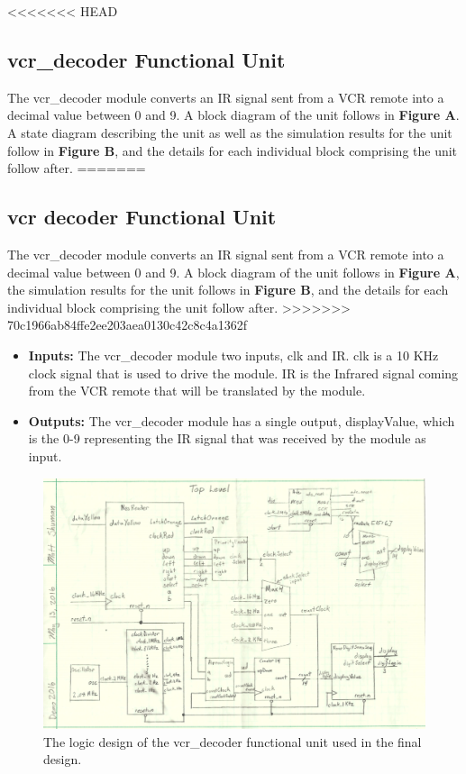 \documentclass[a4paper]{article}
\begin{document}
\clearpage



<<<<<<< HEAD
\subsection{vcr\_decoder Functional Unit}
The vcr\_decoder module converts an IR signal sent from a VCR remote into a decimal value between 0 and 9. A block diagram of the unit follows in \textbf{Figure A}. A state diagram describing the unit as well as the simulation results for the unit follow in \textbf{Figure B}, and the details for each individual block comprising the unit follow after.
=======
\subsection{vcr decoder Functional Unit}
The vcr\_decoder module converts an IR signal sent from a VCR remote into a decimal value between 0 and 9. A block diagram of the unit follows in \textbf{Figure A}, the simulation results for the unit follows in \textbf{Figure B}, and the details for each individual block comprising the unit follow after.
>>>>>>> 70c1966ab84ffe2ee203aea0130c42c8c4a1362f
\begin{itemize}
  \item \textbf{Inputs:  } The vcr\_decoder module two inputs, clk and IR. clk is a 10 KHz clock signal that is used to drive the module. IR is the Infrared signal coming from the VCR remote that will be translated by the module.
  \item \textbf{Outputs: } The vcr\_decoder module has a single output, displayValue, which is the 0-9 representing the IR signal that was received by the module as input.
\end{itemize}
\begin{figure}[h]
  \centering
    \includegraphics[width=.8\textwidth]{images/functional_1.png}
	\caption{The logic design of the vcr\_decoder functional unit used in the final design.}
    \label{fig:functional-1}
\end{figure}
\end{document}
